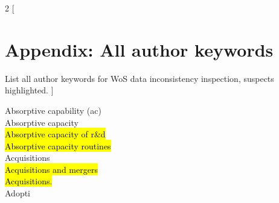 \documentclass[a4paper]{article}
\begin{document}
\begin{multicols*}{2}
[
\section{Appendix: All author keywords}
List all author keywords for WoS data inconsistency inspection, suspects highlighted.
]
\begin{footnotesize}
Absorptive capability (ac) \\ Absorptive capacity \\ \hl{Absorptive capacity of r\&d} \\ \hl{Absorptive capacity routines} \\ Acquisitions \\ \hl{Acquisitions and mergers} \\ \hl{Acquisitions.} \\ Adopti
\end{footnotesize}
\end{multicols*}
\end{document}
